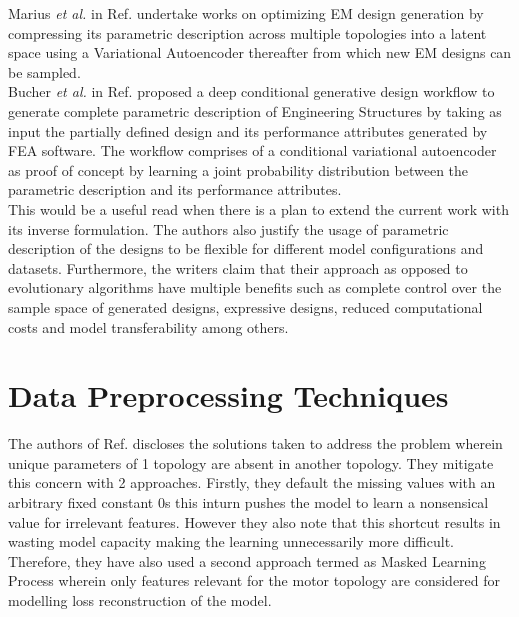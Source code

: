 \documentclass{report} %
\begin{document}
Marius \textit{et al.} in Ref. \cite{VAE-MT-2021} undertake works on optimizing \ac{EM} design generation by compressing its parametric description 
across multiple topologies into a latent space using a Variational Autoencoder thereafter from which new \ac{EM} designs can be sampled.\\
Bucher \textit{et al.} in Ref. \cite{GDEM-2023} proposed a deep conditional generative design workflow to generate complete parametric 
description of Engineering Structures by taking as input the partially defined design and its performance attributes generated by \ac{FEA} software. 
The workflow comprises of a conditional variational autoencoder as proof of concept by learning a joint probability distribution between the parametric description and 
its performance attributes. \\
This would be a useful read when there is a plan to extend the current work with its inverse formulation. 
The authors also justify the usage of parametric description of the designs to be flexible for different model configurations and datasets. 
Furthermore, the writers claim that their approach as opposed to evolutionary algorithms have multiple benefits such as complete control over 
the sample space of generated designs, expressive designs, reduced computational costs and model transferability among others.

\section{Data Preprocessing Techniques}\label{sec:LR Data Preprocessing Techniques}
The authors of Ref. \cite{VAE-MT-2021} discloses the solutions taken to address the problem wherein unique parameters of 1 topology are absent in another topology.
They mitigate this concern with 2 approaches. Firstly, they default the missing values with an arbitrary fixed constant 0s this inturn pushes the model to learn a 
nonsensical value for irrelevant features. However they also note that this shortcut results in wasting model capacity making the learning unnecessarily more difficult.
Therefore, they have also used a second approach termed as Masked Learning Process wherein only features relevant for the motor topology are 
considered for modelling loss reconstruction of the model.
\end{document}
